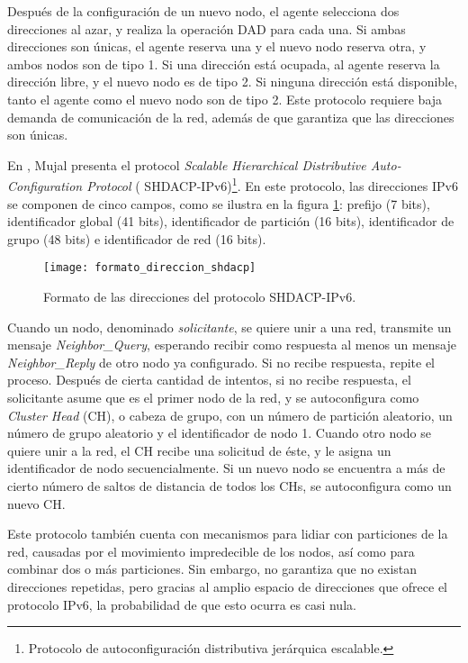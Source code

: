 Después de la configuración de un nuevo nodo, el agente selecciona dos
direcciones al azar, y realiza la operación DAD para cada una. Si ambas
direcciones son únicas, el agente reserva una y el nuevo nodo reserva otra, y
ambos nodos son de tipo 1. Si una dirección está ocupada, al agente reserva la
dirección libre, y el nuevo nodo es de tipo 2. Si ninguna dirección está
disponible, tanto el agente como el nuevo nodo son de tipo 2. Este protocolo
requiere baja demanda de comunicación de la red, además de que garantiza que
las direcciones son únicas.

En \cite{Munjal2015}, Mujal presenta el protocol \textit{Scalable
Hierarchical Distributive Auto-Configuration Protocol} (
SHDACP-IPv6)\footnote{Protocolo de autoconfiguración distributiva jerárquica
escalable.}.
En este protocolo, las direcciones IPv6 se componen de cinco campos, como se
ilustra en la figura \ref{fig:formato_direccion_shdacp}: prefijo (7 bits),
identificador global (41 bits), identificador de partición (16 bits),
identificador de grupo (48 bits) e identificador de red (16 bits).

\begin{figure}[th]
\centering
\texttt{[image: formato\_direccion\_shdacp]}
\decoRule
\caption[Formato de las direcciones del protocolo SHDACP-IPv6]{Formato de las
direcciones del protocolo SHDACP-IPv6\protect\footnotemark.}
\label{fig:formato_direccion_shdacp}
\end{figure}


Cuando un nodo, denominado \textit{solicitante}, se quiere unir a una red,
transmite un mensaje \textit{Neighbor\_Query}, esperando recibir como respuesta
al menos un mensaje \textit{Neighbor\_Reply} de otro nodo ya configurado. Si no
recibe respuesta, repite el proceso. Después de cierta cantidad de intentos, si
no recibe respuesta, el solicitante asume que es el primer nodo de la red, y se
autoconfigura como \textit{Cluster Head} (CH), o cabeza de grupo, con un número
de partición aleatorio, un número de grupo aleatorio y el identificador de nodo
1. Cuando otro nodo se quiere unir a la red, el CH recibe una solicitud de
éste, y le asigna un identificador de nodo secuencialmente. Si un nuevo nodo se
encuentra a más de cierto número de saltos de distancia de todos los CHs, se
autoconfigura como un nuevo CH.

Este protocolo también cuenta con mecanismos para lidiar con particiones de la
red, causadas por el movimiento impredecible de los nodos, así como para
combinar dos o más particiones. Sin embargo, no garantiza que no existan
direcciones repetidas, pero gracias al amplio espacio de direcciones que ofrece
el protocolo IPv6, la probabilidad de que esto ocurra es casi nula.

